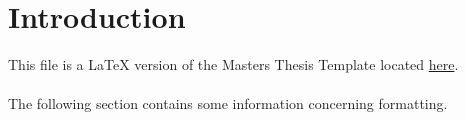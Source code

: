 


\section{Introduction}

\begin{flushleft}
    This file is a LaTeX version of the Masters Thesis Template located \href{http://msc-ai.iit.demokritos.gr/announcements/ekponisi-diplomatikon-ergasion-gia-akadimaiko-etos-2020-2021}{here}. \\~\\

    The following section contains some information concerning formatting.  
\end{flushleft}